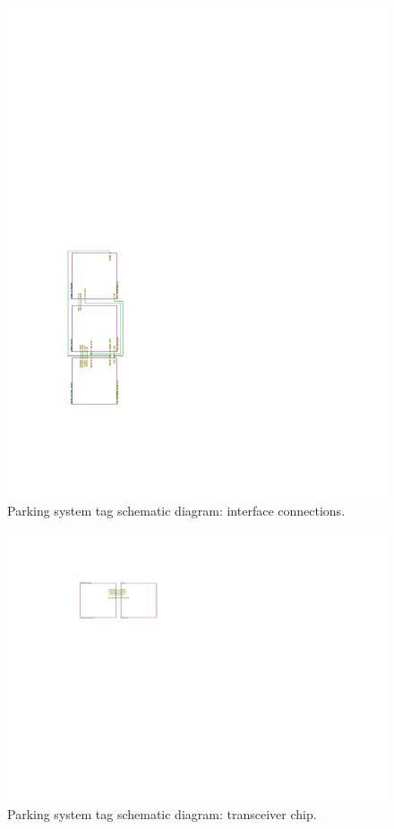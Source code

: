 \begin{figure}[H]
\begin{center}
\includegraphics[page=1,scale=1.5,trim={3cm 5cm 15cm 13cm},clip,angle=-90]{data/parking-system2.pdf}
\caption{Parking system tag schematic diagram: interface connections.}
\end{center}
\end{figure}

\begin{figure}[H]
\begin{center}
\includegraphics[page=2,scale=0.5,trim={0cm 0cm 0cm 0cm},clip]{data/parking-system.pdf}
\caption{Parking system tag schematic diagram: transceiver chip.}
\end{center}
\end{figure}

